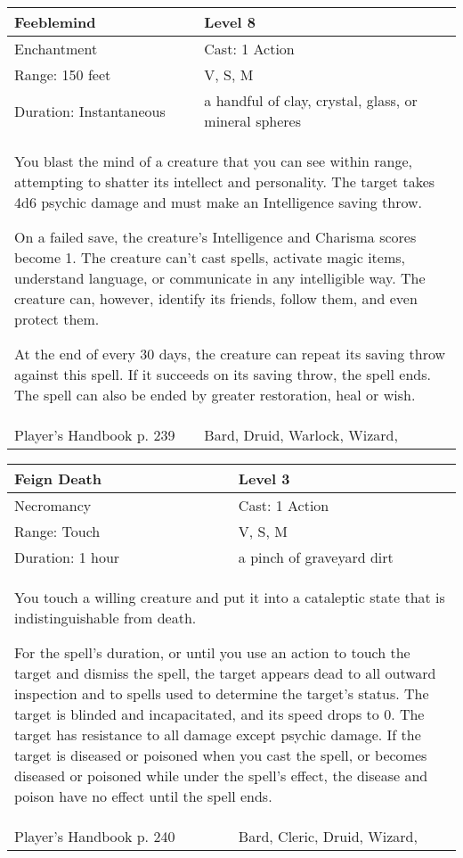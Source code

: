 \documentclass[11pt]{report}
\begin{document}
\begin{table}[H]
	\begin{tabular}{||p{6cm}|p{6cm}||}
		\hline\hline
		\bf{Feeblemind} & Level 8\\ \hline
		Enchantment & Cast: 1 Action\\ \hline
		Range: 150 feet & V, S, M\\ \hline
		Duration: Instantaneous & a handful of clay, crystal, glass, or mineral spheres\\ \hline
		\multicolumn{2}{||p{12cm}||}{You blast the mind of a creature that you can see within range, attempting to shatter its intellect and personality. The target takes 4d6 psychic damage and must make an Intelligence saving throw. 

On a failed save, the creature’s Intelligence and Charisma scores become 1. The creature can’t cast spells, activate magic items, understand language, or communicate in any intelligible way. The creature can, however, identify its friends, follow them, and even protect them. 

At the end of every 30 days, the creature can repeat its saving throw against this spell. If it succeeds on its saving throw, the spell ends. 
The spell can also be ended by greater restoration, heal or wish.}\\ \hline
Player's Handbook p. 239 & Bard, Druid, Warlock, Wizard, \\ \hline\hline
	\end{tabular}
\end{table}

\begin{table}[H]
	\begin{tabular}{||p{6cm}|p{6cm}||}
		\hline\hline
		\bf{Feign Death} & Level 3\\ \hline
		Necromancy & Cast: 1 Action\\ \hline
		Range: Touch & V, S, M\\ \hline
		Duration: 1 hour & a pinch of graveyard dirt\\ \hline
		\multicolumn{2}{||p{12cm}||}{You touch a willing creature and put it into a cataleptic state that is indistinguishable from death. 

For the spell’s duration, or until you use an action to touch the target and dismiss the spell, the target appears dead to all outward inspection and to spells used to determine the target’s status. The target is blinded and incapacitated, and its speed drops to 0. 
The target has resistance to all damage except psychic damage. If the target is diseased or poisoned when you cast the spell, or becomes diseased or poisoned while under the spell’s effect, the disease and poison have no effect until the spell ends.}\\ \hline
Player's Handbook p. 240 & Bard, Cleric, Druid, Wizard, \\ \hline\hline
	\end{tabular}
\end{table}
\end{document}
